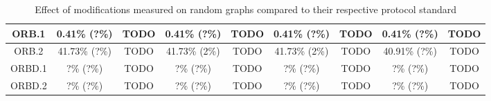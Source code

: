 \begin{table*}
{\begin{tabular}{c|cc|cc|cc|cc|}
\multicolumn{1}{|c|}{ORB.1}       & 0.41\% (?\%)            & TODO               & 0.41\% (?\%)             & TODO               & 0.41\% (?\%)            & TODO               & 0.41\% (?\%)             & TODO               \\ \hline
\multicolumn{1}{|c|}{ORB.2}       & 41.73\% (?\%)            & TODO               & 41.73\% (2\%)             & TODO               & 41.73\% (2\%)            & TODO               & 40.91\% (?\%)             & TODO               \\ \hline
\multicolumn{1}{|c|}{ORBD.1}      & ?\% (?\%)            & TODO               & ?\% (?\%)             & TODO               & ?\% (?\%)            & TODO               & ?\% (?\%)             & TODO               \\ \hline
\multicolumn{1}{|c|}{ORBD.2}      & ?\% (?\%)            & TODO               & ?\% (?\%)             & TODO               & ?\% (?\%)            & TODO               & ?\% (?\%)             & TODO               \\ \hline
\end{tabular}
    }
  \caption{Effect of modifications measured on random graphs compared to their respective protocol standard}
  \label{eval:individual-results}
\end{table*}

